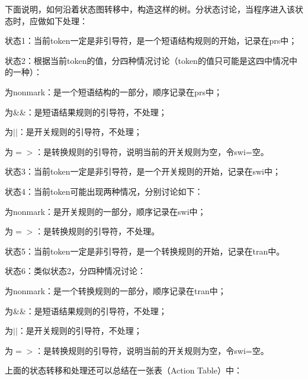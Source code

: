 \documentclass{article}
\begin{document}
\begin{CJK}{UTF8}{gbsn}
下面说明，如何沿着状态图转移中，构造这样的树。分状态讨论，当程序进入该状态时，应做如下处理：
\begin{itemize*}
\item 状态1：当前token一定是非引导符，是一个短语结构规则的开始，记录在prs中；
\item 状态2：根据当前token的值，分四种情况讨论（token的值只可能是这四中情况中的一种）：
\begin{itemize*}
\item 为nonmark：是一个短语结构的一部分，顺序记录在prs中；
\item 为\&\&：是短语结果规则的引导符，不处理；
\item 为$||$：是开关规则的引导符，不处理；
\item 为$=>$：是转换规则的引导符，说明当前的开关规则为空，令swi=空。
\end{itemize*}
\item 状态3：当前token一定是非引导符，是一个开关规则的开始，记录在swi中；
\item 状态4：当前token可能出现两种情况，分别讨论如下：
\begin{itemize*}
\item 为nonmark：是开关规则的一部分，顺序记录在swi中；
\item 为$=>$：是转换规则的引导符，不处理。
\end{itemize*}
\item 状态5：当前token一定是非引导符，是一个转换规则的开始，记录在tran中。
\item 状态6：类似状态2，分四种情况讨论：
\begin{itemize*}
\item 为nonmark：是一个转换规则的一部分，顺序记录在tran中；
\item 为\&\&：是短语结果规则的引导符，不处理；
\item 为$||$：是开关规则的引导符，不处理；
\item 为$=>$：是转换规则的引导符，说明当前的开关规则为空，令swi=空。
\end{itemize*}
\end{itemize*}

上面的状态转移和处理还可以总结在一张表（Action Table）中：


\end{CJK}
\end{document}
